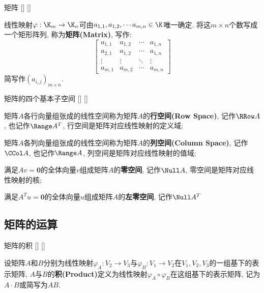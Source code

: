 \documentclass[UTF8]{ctexart}
\begin{document}
		\begin{dfn}
			[]
			{矩阵}
			[]
			[]

			线性映射$\varphi:\K_m\to \K_n$可由$a_{1,1},a_{1,2},\cdots a_{m,n}\in\K$唯一确定. 将这$m\times n$个数写成一个矩形阵列, 称为\textbf{矩阵(Matrix)}, 写作: 
			$$\begin{bmatrix}
				a_{1,1}&a_{1,2}&\cdots&a_{1,n}\\
				a_{2,1}&a_{1,2}&\cdots&a_{1,n}\\
				\vdots&\vdots&\ddots&\vdots\\
				a_{m,1}&a_{m,2}&\cdots&a_{m,n}
			\end{bmatrix}$$
			简写作$(a_{i,j})_{m\times n}$. 
		\end{dfn}
		
		\begin{dfn}
			[]
			{矩阵的四个基本子空间}
			[]
			[]

			矩阵$A$各行向量组张成的线性空间称为矩阵$A$的\textbf{行空间(Row Space)}, 记作$\RRow A$, 也记作$\Range A^T$, 行空间是矩阵对应线性映射的定义域; 
			
			矩阵$A$各列向量组张成的线性空间称为矩阵$A$的\textbf{列空间(Column Space)}, 记作$\CCol A$, 也记作$\Range A$, 列空间是矩阵对应线性映射的值域; 

			满足$Av=\mathbf{0}$的全体向量$v$组成矩阵$A$的\textbf{零空间}, 记作$\Null A$, 零空间是矩阵对应线性映射的核; 

			满足$A^T u=\mathbf{0}$的全体向量$u$组成矩阵$A$的\textbf{左零空间}, 记作$\Null A^T$
		\end{dfn}
	
	\subsection{矩阵的运算}
		\begin{dfn}
			[]
			{矩阵的积}
			[]
			[]

			设矩阵$A$和$B$分别为线性映射$\varphi_A: V_2\to V_3$与$\varphi_B:V_1\to V_2$在$V_1,V_2,V_3$的一组基下的表示矩阵, $A$与$B$的\textbf{积(Product)}定义为线性映射$\varphi_A\circ\varphi_B$在这组基下的表示矩阵, 记为$A\cdot B$或简写为$AB$. 
		\end{dfn}
		
\end{document}
